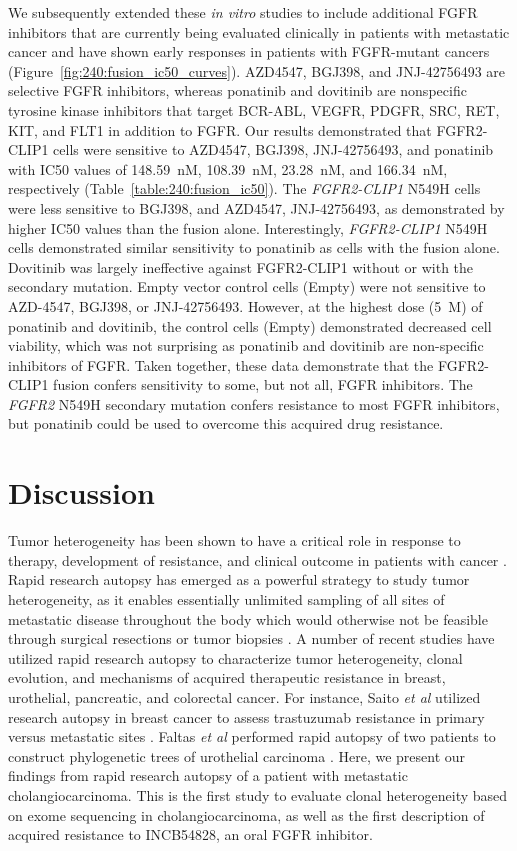 We subsequently extended these \textit{in vitro} studies to include additional FGFR inhibitors that are currently being evaluated clinically in patients with metastatic cancer and have shown early responses in patients with FGFR-mutant cancers (Figure~\ref{fig:240:fusion_ic50_curves}). AZD4547, BGJ398, and JNJ-42756493 are selective FGFR inhibitors, whereas ponatinib and dovitinib are nonspecific tyrosine kinase inhibitors that target BCR-ABL, VEGFR, PDGFR, SRC, RET, KIT, and FLT1 in addition to FGFR\@. Our results demonstrated that FGFR2-CLIP1 cells were sensitive to AZD4547, BGJ398, JNJ-42756493, and ponatinib with IC50 values of 148.59~nM, 108.39~nM, 23.28~nM, and 166.34~nM, respectively (Table~\ref{table:240:fusion_ic50}). The \textit{FGFR2-CLIP1} N549H cells were less sensitive to BGJ398, and AZD4547, JNJ-42756493, as demonstrated by higher IC50 values than the fusion alone. Interestingly, \textit{FGFR2-CLIP1} N549H cells demonstrated similar sensitivity to ponatinib as cells with the fusion alone. Dovitinib was largely ineffective against FGFR2-CLIP1 without or with the secondary mutation. Empty vector control cells (Empty) were not sensitive to AZD-4547, BGJ398, or JNJ-42756493. However, at the highest dose (5~\textmu{}M) of ponatinib and dovitinib, the control cells (Empty) demonstrated decreased cell viability, which was not surprising as ponatinib and dovitinib are non-specific inhibitors of FGFR\@. Taken together, these data demonstrate that the FGFR2-CLIP1 fusion confers sensitivity to some, but not all, FGFR inhibitors. The \textit{FGFR2} N549H secondary mutation confers resistance to most FGFR inhibitors, but ponatinib could be used to overcome this acquired drug resistance.

\section{Discussion}
Tumor heterogeneity has been shown to have a critical role in response to therapy, development of resistance, and clinical outcome in patients with cancer \cite{choi2017,joung2017,rottenberg2012}. Rapid research autopsy has emerged as a powerful strategy to study tumor heterogeneity, as it enables essentially unlimited sampling of all sites of metastatic disease throughout the body which would otherwise not be feasible through surgical resections or tumor biopsies \cite{krook2019_review}. A number of recent studies have utilized rapid research autopsy to characterize tumor heterogeneity, clonal evolution, and mechanisms of acquired therapeutic resistance in breast, urothelial, pancreatic, and colorectal cancer. For instance, Saito \textit{et al} utilized research autopsy in breast cancer to assess trastuzumab resistance in primary versus metastatic sites \cite{saito2015}. Faltas \textit{et al} performed rapid autopsy of two patients to construct phylogenetic trees of urothelial carcinoma \cite{faltas2016}. Here, we present our findings from rapid research autopsy of a patient with metastatic cholangiocarcinoma. This is the first study to evaluate clonal heterogeneity based on exome sequencing in cholangiocarcinoma, as well as the first description of acquired resistance to INCB54828, an oral FGFR inhibitor.

